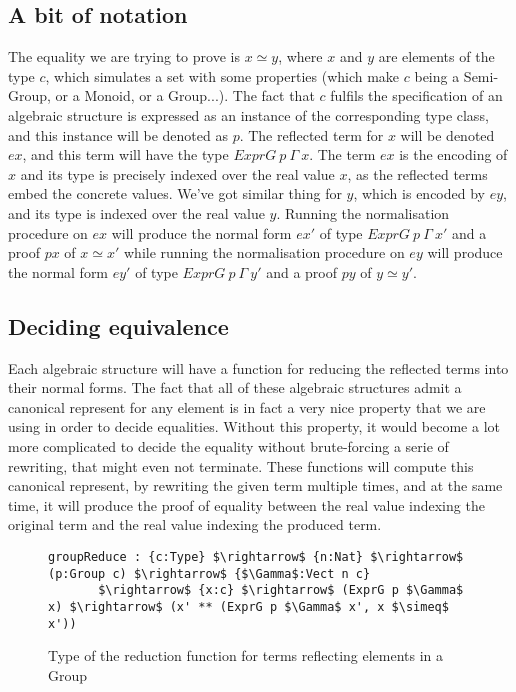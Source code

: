 	\subsection {A bit of notation}
The equality we are trying to prove is $x \simeq y$, where $x$ and $y$ are elements of the type $c$, which  simulates a set with some properties (which make $c$ being a Semi-Group, or a Monoid, or a Group...). The fact that $c$ fulfils the specification of an algebraic structure is expressed as an instance of the corresponding type class, and this instance will be denoted as $p$.
The reflected term for $x$ will be denoted $ex$, and this term will have the type $ExprG\ p\ \Gamma\ x$. The term $ex$ is the encoding of $x$ and its type is precisely indexed over the real value $x$, as the reflected terms embed the concrete values.
We've got similar thing for $y$, which is encoded by $ey$, and its type is indexed over the real value $y$.
Running the normalisation procedure on $ex$ will produce the normal form $ex'$ of type $ExprG\ p\ \Gamma\ x'$ and a proof $px$ of $x \simeq x'$ while running the normalisation procedure on $ey$ will produce the normal form $ey'$ of type $ExprG\ p\ \Gamma\ y'$ and a proof $py$ of $y \simeq y'$.

	\subsection {Deciding equivalence}
	
Each algebraic structure will have a function for reducing the reflected terms into their normal forms. The fact that all of these algebraic structures admit a canonical represent for any element is in fact a very nice property that we are using in order to decide equalities. Without this property, it would become a lot more complicated to decide the equality without brute-forcing a serie of rewriting, that might even not terminate.
These functions will compute this canonical represent, by rewriting the given term multiple times, and at the same time, it will produce the proof of equality between the real value indexing the original term and the real value indexing the produced term.

\begin{figure}[H]
\figrule
\begin{center}
\begin{lstlisting}
groupReduce : {c:Type} $\rightarrow$ {n:Nat} $\rightarrow$ (p:Group c) $\rightarrow$ {$\Gamma$:Vect n c} 
	   $\rightarrow$ {x:c} $\rightarrow$ (ExprG p $\Gamma$ x) $\rightarrow$ (x' ** (ExprG p $\Gamma$ x', x $\simeq$ x'))
\end{lstlisting}
\end{center}
\caption{Type of the reduction function for terms reflecting elements in a Group}
\label{groupReduce}
\figrule
\end{figure}

